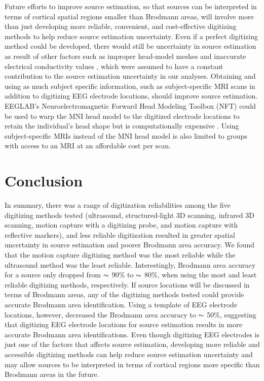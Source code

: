 \documentclass[../thesis_seyed.tex]{subfiles}
\begin{document}
Future efforts to improve source estimation, so that sources can be interpreted in terms of cortical spatial regions smaller than Brodmann areas, will involve more than just developing more reliable, convenient, and cost-effective digitizing methods to help reduce source estimation uncertainty. Even if a perfect digitizing method could be developed, there would still be uncertainty in source estimation as result of other factors such as improper head-model meshes and inaccurate electrical conductivity values \cite{Beltrachini2019-lf, Akalin_Acar2016-jr}, which were assumed to have a constant contribution to the source estimation uncertainty in our analyses. Obtaining and using as much subject specific information, such as subject-specific MRI scans in addition to digitizing EEG electrode locations, should improve source estimation. EEGLAB's Neuroelectromagnetic Forward Head Modeling Toolbox (NFT) could be used to warp the MNI head model to the digitized electrode locations to retain the individual's head shape but is computationally expensive \cite{Acar2010-ye}. Using subject-specific MRIs instead of the MNI head model is also limited to groups with access to an MRI at an affordable cost per scan.

\section{Conclusion}

In summary, there was a range of digitization reliabilities among the five digitizing methods tested (ultrasound, structured-light 3D scanning, infrared 3D scanning, motion capture with a digitizing probe, and motion capture with reflective markers), and less reliable digitization resulted in greater spatial uncertainty in source estimation and poorer Brodmann area accuracy. We found that the motion capture digitizing method was the most reliable while the ultrasound method was the least reliable. Interestingly, Brodmann area accuracy for a source only dropped from $\thicksim$ 90\% to $\thicksim$ 80\%, when using the most and least reliable digitizing methods, respectively. If source locations will be discussed in terms of Brodmann areas, any of the digitizing methods tested could provide accurate Brodmann area identification. Using a template of EEG electrode locations, however, decreased the Brodmann area accuracy to $\thicksim$ 50\%, suggesting that digitizing EEG electrode locations for source estimation results in more accurate Brodmann area identifications. Even though digitizing EEG electrodes is just one of the factors that affects source estimation, developing more reliable and accessible digitizing methods can help reduce source estimation uncertainty and may allow sources to be interpreted in terms of cortical regions more specific than Brodmann areas in the future. 





\end{document}
